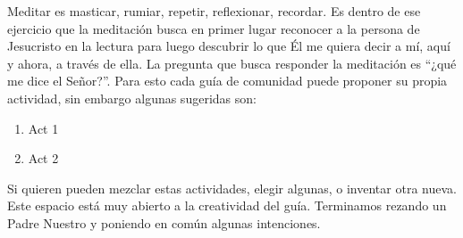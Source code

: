 Meditar es masticar, rumiar, repetir, reflexionar, recordar. Es dentro de ese ejercicio que la meditación busca en primer lugar reconocer a la persona de Jesucristo en la lectura para luego descubrir lo que Él me quiera decir a mí, aquí y ahora, a través de ella. La pregunta que busca responder la meditación es “¿qué me dice el Señor?”. Para esto cada guía de comunidad puede proponer su propia actividad, sin embargo algunas sugeridas son:

\begin{enumerate}
  \item Act 1
  \item Act 2
\end{enumerate}
    
Si quieren pueden mezclar estas actividades, elegir algunas, o inventar otra nueva. Este espacio está muy abierto a la creatividad del guía.  
Terminamos rezando un Padre Nuestro y poniendo en común algunas intenciones.